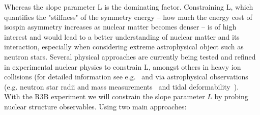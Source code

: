 Whereas the slope parameter L is the dominating factor. Constraining L, which quantifies the "stiffness" of the symmetry energy -- how much the energy cost of isospin asymmetry increases as nuclear matter becomes denser -- is of high interest and would lead to a better understanding of nuclear matter and its interaction, especially when considering extreme astrophysical object such as neutron stars.\newline
Several physical approaches are currently being tested and refined in experimental nuclear physics to constrain L, amongst others in heavy ion collisions (for detailed information see e.g.~\cite{tsang2011constraints,tsang2024constraining,wang2020study,jhang2021symmetry} and via astrophysical observations (e.g. neutron star radii and mass measurements~\cite{bogdanov2021constraining,nattila2017neutron,radice2019multimessenger} and tidal deformability~\cite{hu2020effects,raithel2019measurement}).\\
With the R3B experiment we will constrain the slope parameter $L$ by probing nuclear structure observables. Using two main approaches:\\


